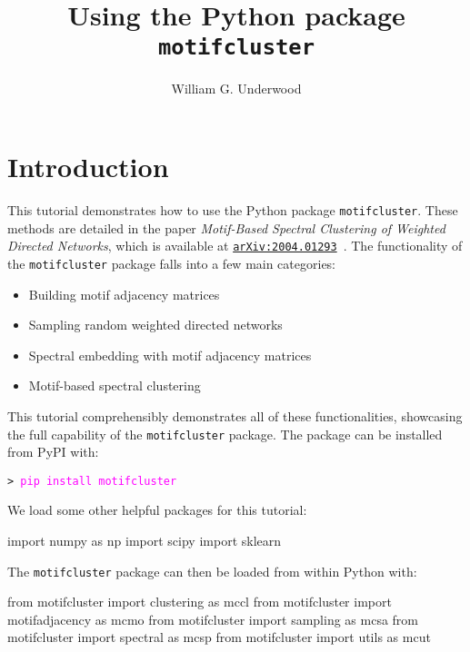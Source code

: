 \documentclass{article}
\title{Using the Python package \texttt{motifcluster}}
\author{William G. Underwood}
\begin{document}
\maketitle
\tableofcontents

\pagebreak

\section{Introduction}

This tutorial demonstrates how to use the Python package \texttt{motifcluster}.
These methods are detailed in the paper
\textit{Motif-Based Spectral Clustering of Weighted Directed Networks},
which is available at
\href{https://arxiv.org/abs/2004.01293}{\texttt{arXiv:2004.01293}}~\cite{UnderwoodElliottCucuringu_2020_Motifs}.
The functionality of the \texttt{motifcluster} package falls into a few main
categories:

\begin{itemize}
\item Building motif adjacency matrices
\item Sampling random weighted directed networks
\item Spectral embedding with motif adjacency matrices
\item Motif-based spectral clustering
\end{itemize}

This tutorial comprehensibly demonstrates all of these functionalities,
showcasing the full capability of the \texttt{motifcluster} package.
The package can be installed from PyPI with:

\vspace*{2mm}
\texttt{> \textcolor{Fuchsia}{pip install motifcluster}}
\vspace*{3mm}

We load some other helpful packages for this tutorial:
\begin{pyconsole}
import numpy as np
import scipy
import sklearn
\end{pyconsole}

\vspace*{-3mm}

The \texttt{motifcluster} package can then be loaded
from within Python with:

\begin{pyconsole}
from motifcluster import clustering as mccl
from motifcluster import motifadjacency as mcmo
from motifcluster import sampling as mcsa
from motifcluster import spectral as mcsp
from motifcluster import utils as mcut
\end{pyconsole}
\end{document}
